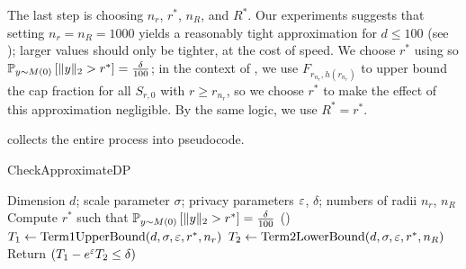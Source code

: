 The last step is choosing $n_r$, $r^*$, $n_R$, and $R^*$. Our experiments suggests that setting $n_r = n_R = 1000$ yields a reasonably tight approximation for $d \leq 100$ (see ); larger values should only be tighter, at the cost of speed. We choose $r^*$ using  so $\P{y \sim M(0)}{\|y\|_2 > r^*} = \frac{\delta}{100}$; in the context of , we use $F_{r_{n_r}, h(r_{n_r})}$ to upper bound the cap fraction for all $S_{r,0}$ with $r \geq r_{n_r}$, so we choose $r^*$ to make the effect of this approximation negligible. By the same logic, we use $R^* = r^*$.

 collects the entire process into pseudocode.

\begin{algorithm}
    \caption{CheckApproximateDP}
    \label{alg:overall}
    \begin{algorithmic}[1]
     Dimension $d$; scale parameter $\sigma$; privacy parameters $\eps$, $\delta$; numbers of radii $n_r$, $n_R$
    \STATE Compute $r^*$ such that $\P{y \sim M(0)}{\|y\|_2 > r^*} = \frac{\delta}{100}$ ()
    \STATE $T_1 \gets \text{Term1UpperBound}(d, \sigma, \eps, r^*, n_r)$
    \STATE $T_2 \gets \text{Term2LowerBound}(d, \sigma, \eps, r^*, n_R)$
    \STATE Return $(T_1 - e^\eps T_2 \leq \delta)$
    \end{algorithmic}
\end{algorithm}